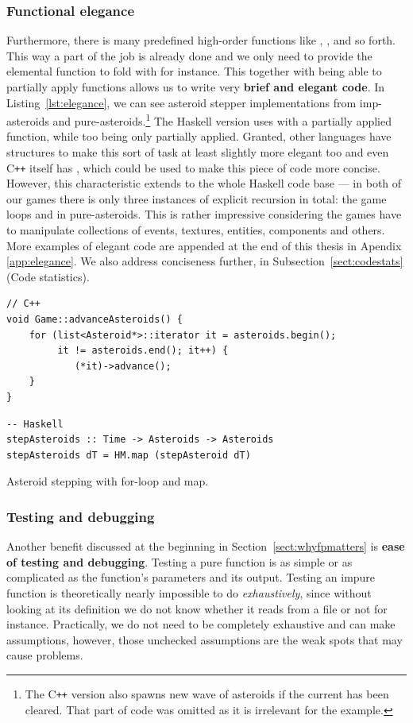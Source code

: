 \documentclass[
  digital, %
  color,   %
  table,   %
  oneside, %
  lof,     %
  lot,     %
]{fithesis3}
\newcommand{\cpp}{C\nolinebreak\texttt{+}\nolinebreak\texttt{+}}
\begin{document}
{\subsubsection{Functional elegance}
Furthermore, there is many predefined high-order functions like
, ,  and so forth. This way a part of the
job is already done and we only need to provide the elemental function to fold with for instance.
This together with being able to partially apply functions allows us to write
very \textbf{brief and elegant code}. In Listing~\ref{lst:elegance},
we can see asteroid stepper implementations
from imp-asteroids and pure-asteroids.\footnote{
The \cpp{} version also spawns new wave of asteroids if the current has been cleared.
That part of code was omitted as it is irrelevant for the example.
} The Haskell version uses  with a partially applied function,
while too being only partially applied. Granted, other languages have structures
to make this sort of task at least slightly more elegant too
and even \cpp{} itself has ,
which could be used to make this piece of code more concise. However, this characteristic extends
to the whole Haskell code base --- in both of our games there is only three instances
of explicit recursion in total: the game loops and  in pure-asteroids.
This is rather impressive considering the games have to manipulate collections of events,
textures, entities, components and others. More examples of elegant code are appended at the end
of this thesis in Apendix \ref{app:elegance}.
We also address conciseness further, in Subsection~\ref{sect:codestats} (Code statistics).
\begin{listing}[H]
\begin{verbatim}
// C++
void Game::advanceAsteroids() {
    for (list<Asteroid*>::iterator it = asteroids.begin();
         it != asteroids.end(); it++) {
            (*it)->advance();
    }
}
\end{verbatim}

\begin{verbatim}
-- Haskell
stepAsteroids :: Time -> Asteroids -> Asteroids
stepAsteroids dT = HM.map (stepAsteroid dT)
\end{verbatim}
\caption{Asteroid stepping with for-loop and map.}
\label{lst:elegance}
\end{listing}


\subsubsection{Testing and debugging}
Another benefit discussed at the beginning in Section~\ref{sect:whyfpmatters}
is \textbf{ease of testing and debugging}. Testing a pure function is as simple or as complicated
as the function's parameters and its output. Testing an impure function is
theoretically nearly impossible to do \emph{exhaustively}, since without looking at
its definition we do not know whether it reads from a file or not for instance.
Practically, we do not need to be completely exhaustive and can make assumptions,
however, those unchecked assumptions are the weak spots that may cause problems.

}
\end{document}
